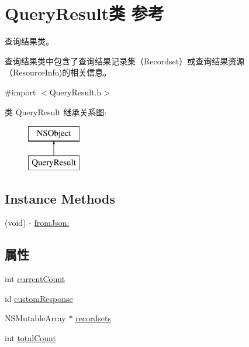 \hypertarget{interface_query_result}{\section{Query\-Result类 参考}
\label{interface_query_result}
}


查询结果类。\par
 查询结果类中包含了查询结果记录集（\-Recordset）或查询结果资源（\-Resource\-Info)的相关信息。  




{\ttfamily \#import $<$Query\-Result.\-h$>$}

类 Query\-Result 继承关系图\-:\begin{figure}[H]
\begin{center}
\leavevmode
\includegraphics[height=2.000000cm]{interface_query_result}
\end{center}
\end{figure}
\subsection*{Instance Methods}
\begin{DoxyCompactItemize}
\item 
(void) -\/ \hyperlink{interface_query_result_a7b544bf7eda0db130df7a168024f1705}{from\-Json\-:}
\end{DoxyCompactItemize}
\subsection*{属性}
\begin{DoxyCompactItemize}
\item 
int \hyperlink{interface_query_result_ae765c93f480df132156e52d30bdba658}{current\-Count}
\item 
id \hyperlink{interface_query_result_af268ab97cb214a7c2ef2b8051904d171}{custom\-Response}
\item 
N\-S\-Mutable\-Array $\ast$ \hyperlink{interface_query_result_aafa1ccf4b6f17ccf7eb40a9065fc2331}{recordsets}
\item 
int \hyperlink{interface_query_result_a8b261d4cb2e36b27791f064789c8644b}{total\-Count}
\end{DoxyCompactItemize}


